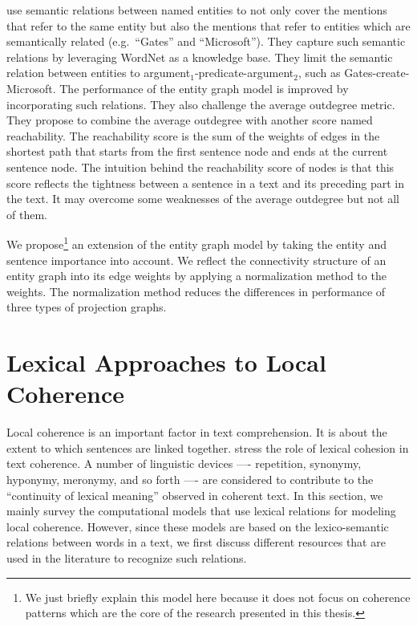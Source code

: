  use semantic relations between named entities to not only cover 
the mentions that refer to the same entity but also the mentions that refer to entities which are semantically related (e.g.\ ``Gates'' and ``Microsoft''). 
They capture such semantic relations by leveraging WordNet \cite{baccianella10} as a knowledge base. 
They limit the semantic relation between entities to argument$_1$-predicate-argument$_2$, such as \mbox{Gates-create-Microsoft}. 
The performance of the entity graph model is improved by incorporating such relations. 
They also challenge the average outdegree metric.
They propose to combine the average outdegree with another score named reachability. 
The reachability score is the sum of the weights of edges in the shortest path that starts from the first sentence node and ends at the current sentence node. 
The intuition behind the reachability score of nodes is that this score reflects the tightness between a sentence in a text and its preceding part in the text. 
It may overcome some weaknesses of the average outdegree but not all of them.   

We propose\footnote{We just briefly explain this model here because it does not focus on coherence patterns which are the core of the research presented in this thesis.} \cite{mesgar14} an extension of the entity graph model by taking the entity and sentence importance into account. 
We reflect the connectivity structure of an entity graph into its edge weights by applying a normalization method to the weights.  
The normalization method reduces the differences in performance of three types of projection graphs.


\section{Lexical Approaches to Local Coherence}

Local coherence is an important factor in text comprehension.
It is about the extent to which sentences are linked together. 
 stress the role of lexical cohesion in text coherence. 
A number of linguistic devices —- repetition, synonymy, hyponymy, meronymy, and so forth —- are considered to contribute to the ``continuity of lexical meaning'' observed in coherent text. 
In this section, we mainly survey the computational models that use lexical relations for modeling local coherence. 
However, since these models are based on the lexico-semantic relations between words in a text, we first discuss different resources that are used in the literature to recognize such relations. 

